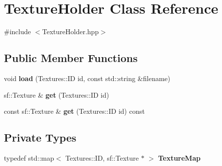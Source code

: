 \hypertarget{classTextureHolder}{\section{\-Texture\-Holder \-Class \-Reference}
\label{classTextureHolder}
}


{\ttfamily \#include $<$\-Texture\-Holder.\-hpp$>$}

\subsection*{\-Public \-Member \-Functions}
\begin{DoxyCompactItemize}
\item 
\hypertarget{classTextureHolder_a7a88fb0da3c2754e80026d65eb024551_a7a88fb0da3c2754e80026d65eb024551}{void {\bfseries load} (\-Textures\-::\-I\-D id, const std\-::string \&filename)}\label{classTextureHolder_a7a88fb0da3c2754e80026d65eb024551_a7a88fb0da3c2754e80026d65eb024551}

\item 
\hypertarget{classTextureHolder_a3a319ddaa24fb4e990af3d5c6b58ff4d_a3a319ddaa24fb4e990af3d5c6b58ff4d}{sf\-::\-Texture \& {\bfseries get} (\-Textures\-::\-I\-D id)}\label{classTextureHolder_a3a319ddaa24fb4e990af3d5c6b58ff4d_a3a319ddaa24fb4e990af3d5c6b58ff4d}

\item 
\hypertarget{classTextureHolder_af1f14ad2ea40a6868a04e874105ce4a2_af1f14ad2ea40a6868a04e874105ce4a2}{const sf\-::\-Texture \& {\bfseries get} (\-Textures\-::\-I\-D id) const }\label{classTextureHolder_af1f14ad2ea40a6868a04e874105ce4a2_af1f14ad2ea40a6868a04e874105ce4a2}

\end{DoxyCompactItemize}
\subsection*{\-Private \-Types}
\begin{DoxyCompactItemize}
\item 
\hypertarget{classTextureHolder_a0413de5ea86e66ff2c9e3b48273b59a9_a0413de5ea86e66ff2c9e3b48273b59a9}{typedef std\-::map$<$ \-Textures\-::\-I\-D, \*
sf\-::\-Texture $\ast$ $>$ {\bfseries \-Texture\-Map}}\label{classTextureHolder_a0413de5ea86e66ff2c9e3b48273b59a9_a0413de5ea86e66ff2c9e3b48273b59a9}

\end{DoxyCompactItemize}

